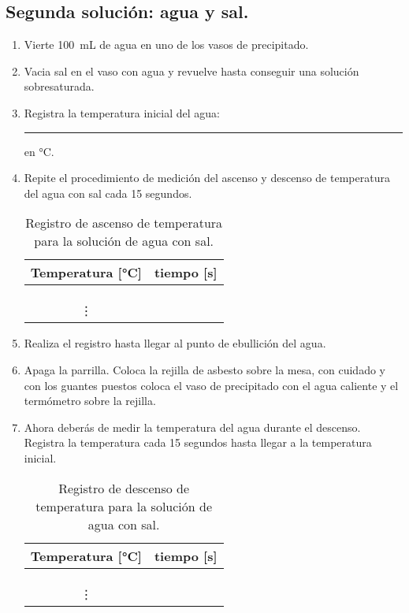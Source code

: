\documentclass[14pt]{extarticle}
\begin{document}
\subsection{Segunda solución: agua y sal.}

\begin{enumerate}
\item Vierte \SI{100}{\milli\liter} de agua en uno de los vasos de precipitado.
\item Vacia sal en el vaso con agua y revuelve hasta conseguir una solución sobresaturada.
\item Registra la temperatura inicial del agua: \rule{2cm}{0.1mm} en \si{\degreeCelsius}.
\item Repite el procedimiento de medición del ascenso y descenso de temperatura del agua con sal cada \num{15} segundos.
\begin{table}[H]
\centering
\begin{tabular}{| c | c |} \hline
Temperatura [\si{\degreeCelsius}] & tiempo [\si{\second}] \\ \hline
 & \\ \hline
 & \\ \hline
 & \\ \hline
\vdots & \\ \hline
\end{tabular}
\caption{Registro de ascenso de temperatura para la solución de agua con sal.}
\end{table}
\item Realiza el registro hasta llegar al punto de ebullición del agua.
\item Apaga la parrilla. Coloca la rejilla de asbesto sobre la mesa, con cuidado y con los guantes puestos coloca el vaso de precipitado con el agua caliente y el termómetro sobre la rejilla.
\item Ahora deberás de medir la temperatura del agua durante el descenso. Registra la temperatura cada \num{15} segundos hasta llegar a la temperatura inicial.
\begin{table}[H]
\centering
\begin{tabular}{| c | c |} \hline
Temperatura [\si{\degreeCelsius}] & tiempo [\si{\second}] \\ \hline
 & \\ \hline
 & \\ \hline
 & \\ \hline
\vdots & \\ \hline
\end{tabular}
\caption{Registro de descenso de temperatura para la solución de agua con sal.}
\end{table}
\end{enumerate}
\end{document}
